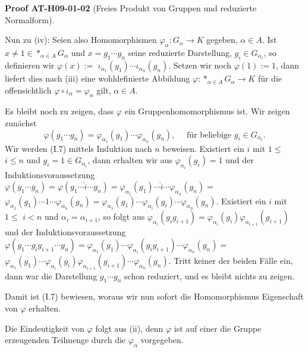 \documentclass[10pt, letterpaper]{article}
\newcommand{\CustomHeading}[3]{%
  \par\medskip\noindent%
  \textbf{#1 #2} \textnormal{(#3)}.\enskip%
}
\newenvironment{PROOF}[2]{\CustomHeading{Proof}{#1}{#2}}{}
\begin{document}
\begin{PROOF}{AT-H09-01-02}{Freies Produkt von Gruppen und reduzierte Normalform}
Nun zu (iv): Seien also Homomorphismen $\varphi_\alpha: G_\alpha \rightarrow K$ gegeben, $\alpha \in A$. Ist $x \neq 1 \in *_{\alpha \in A} G_\alpha$ und $x=g_1 \cdots g_n$ seine reduzierte Darstellung, $g_i \in G_{\alpha_i}$, so definieren wir $\varphi(x):=$ $\iota_{\alpha_1}\left(g_1\right) \cdots \iota_{\alpha_n}\left(g_n\right)$. Setzen wir noch $\varphi(1):=1$, dann liefert dies nach (iii) eine wohldefinierte Abbildung $\varphi: *_{\alpha \in A} G_\alpha \rightarrow K$ für die offensichtlich $\varphi \circ \iota_\alpha=\varphi_\alpha$ gilt, $\alpha \in A$. 

Es bleibt noch zu zeigen, dass $\varphi$ ein Gruppenhomomorphismus ist. Wir zeigen zunächst
$$
\varphi\left(g_1 \cdots g_n\right)=\varphi_{\alpha_1}\left(g_1\right) \cdots \varphi_{\alpha_n}\left(g_n\right), \quad \text { für beliebige } g_i \in G_{\alpha_i} .
$$
Wir werden (I.7) mittels Induktion nach $n$ beweisen. Existiert ein $i$ mit $1 \leq$ $i \leq n$ und $g_i=1 \in G_{\alpha_i}$, dann erhalten wir aus $\varphi_{\alpha_i}\left(g_i\right)=1$ und der Induktionsvoraussetzung $\varphi\left(g_1 \cdots g_n\right)=\varphi\left(g_1 \cdots \hat{i} \cdots g_n\right)=\varphi_{\alpha_1}\left(g_1\right) \cdots \hat{i} \cdots \varphi_{\alpha_n}\left(g_n\right)=$ $\varphi_{\alpha_1}\left(g_1\right) \cdots 1 \cdots \varphi_{\alpha_n}\left(g_n\right)=\varphi_{\alpha_1}\left(g_1\right) \cdots \varphi_{\alpha_i}\left(g_i\right) \cdots \varphi_{\alpha_n}\left(g_n\right)$. Existiert ein $i$ mit $1 \leq$ $i<n$ und $\alpha_i=\alpha_{i+1}$, so folgt aus $\varphi_{\alpha_i}\left(g_i g_{i+1}\right)=\varphi_{\alpha_i}\left(g_i\right) \varphi_{\alpha_{i+1}}\left(g_{i+1}\right)$ und der Induktionsvoraussetzung $\varphi\left(g_1 \cdots g_i g_{i+1} \cdots g_n\right)=\varphi_{\alpha_1}\left(g_1\right) \cdots \varphi_{\alpha_i}\left(g_i g_{i+1}\right) \cdots \varphi_{\alpha_n}\left(g_n\right)=$ $\varphi_{\alpha_1}\left(g_1\right) \cdots \varphi_{\alpha_i}\left(g_i\right) \varphi_{\alpha_{i+1}}\left(g_{i+1}\right) \cdots \varphi_{\alpha_n}\left(g_n\right)$. Tritt keiner der beiden Fälle ein, dann war die Darstellung $g_1 \cdots g_n$ schon reduziert, und es bleibt nichts zu zeigen. 

Damit ist (I.7) bewiesen, woraus wir nun sofort die Homomorphismus Eigenschaft von $\varphi$ erhalten. 

Die Eindeutigkeit von $\varphi$ folgt aus (ii), denn $\varphi$ ist auf einer die Gruppe erzeugenden Teilmenge durch die $\varphi_\alpha$ vorgegeben.
\end{PROOF}
\end{document}

